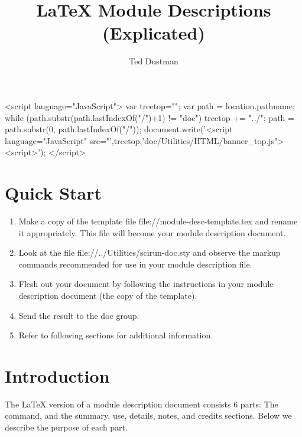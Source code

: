 \documentclass[11pt]{article}
\begin{document}
\begin{rawhtml}
  <script language="JavaScript">
  var treetop="";
  var path = location.pathname;
  while (path.substr(path.lastIndexOf("/")+1) != "doc") {
    treetop += "../";
    path = path.substr(0, path.lastIndexOf("/"));
  }
  document.write('<script language="JavaScript" src="',treetop,'doc/Utilities/HTML/banner_top.js"><\/script>');
  </script>
\end{rawhtml}

\title{\LaTeX{} Module Descriptions (Explicated)}
\author{Ted Dustman}
\maketitle 
\newpage
\tableofcontents
\newpage


\section{Quick Start}

\begin{enumerate}
\item Make a copy of the template file
  {file://module-desc-template.tex} and rename it appropriately. 
  This file will become your module description document.
\item Look at the file 
  {file://../Utilities/scirun-doc.sty} and observe the markup
  commands recommended for use in your module description file.
\item Flesh out your document by following the instructions in your
  module description document (the copy of the template).
\item Send the result to the doc group.
\item Refer to following sections for additional information.
\end{enumerate}

\section{Introduction}

The \LaTeX{} version of a module description document consists 6 parts: The
 command, and the summary, use, details, notes, and
credits sections.  Below we describe the purpose of each part.
\end{document}

